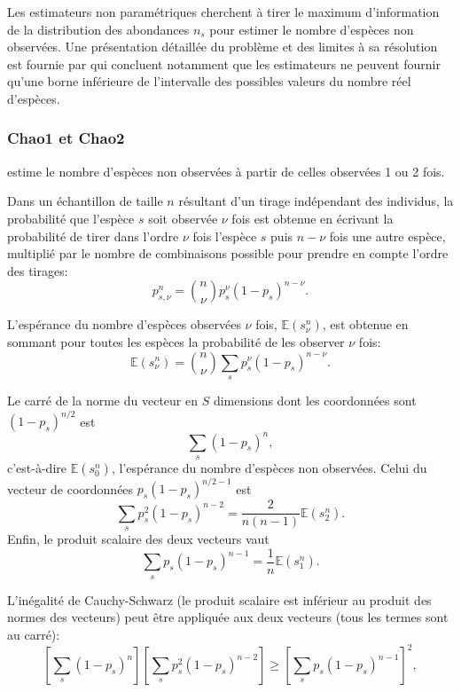 \documentclass[
  11pt,
  french,
  a4paper,
  extrafontsizes,onecolumn,openright
  ]{memoir}
\begin{document}
Les estimateurs non paramétriques cherchent à tirer le maximum d'information de la distribution des abondances \(n_s\) pour estimer le nombre d'espèces non observées.
Une présentation détaillée du problème et des limites à sa résolution est fournie par \textcite{Mao2005} qui concluent notamment que les estimateurs ne peuvent fournir qu'une borne inférieure de l'intervalle des possibles valeurs du nombre réel d'espèces.

\subsubsection{Chao1 et Chao2}\label{chao1-et-chao2}

\textcite{Chao1984} estime le nombre d'espèces non observées à partir de celles observées 1 ou 2 fois.

Dans un échantillon de taille \(n\) résultant d'un tirage indépendant des individus, la probabilité que l'espèce \(s\) soit observée \(\nu\) fois est obtenue en écrivant la probabilité de tirer dans l'ordre \(\nu\) fois l'espèce \(s\) puis \(n-\nu\) fois une autre espèce, multiplié par le nombre de combinaisons possible pour prendre en compte l'ordre des tirages:
\begin{equation}
  \label{eq:psnu}
  p^{n}_{s, \nu} = \binom{n}{\nu} {p_s^\nu \left( 1-p_s \right)^{n-\nu}}.
\end{equation}

L'espérance du nombre d'espèces observées \(\nu\) fois, \({\mathbb E}(s^{n}_{\nu})\), est obtenue en sommant pour toutes les espèces la probabilité de les observer \(\nu\) fois:
\begin{equation}
  \label{eq:Esnnu}
  {\mathbb E}\left( s^{n}_{\nu} \right) = \binom{n}{\nu} \sum_s{p_s^\nu \left( 1-p_s \right)^{n-\nu}}.
\end{equation}

Le carré de la norme du vecteur en \(S\) dimensions dont les coordonnées sont \((1-p_s)^{n/2}\) est
\[\sum_s{(1-p_s)^n},\]
c'est-à-dire \({\mathbb E}(s^{n}_{0})\), l'espérance du nombre d'espèces non observées.
Celui du vecteur de coordonnées \(p_s (1-p_s)^{n/2-1}\) est
\[\sum_s{p_s^2(1-p_s)^{n-2}}=\frac{2}{n(n-1)}{\mathbb E}(s^{n}_{2}).\]
Enfin, le produit scalaire des deux vecteurs vaut
\[\sum_s{p_s(1-p_s)^{n-1}}=\frac{1}{n}{\mathbb E}(s^{n}_{1}).\]

L'inégalité de Cauchy-Schwarz (le produit scalaire est inférieur au produit des normes des vecteurs) peut être appliquée aux deux vecteurs (tous les termes sont au carré):
\begin{equation}
  \label{eq:CauchySchwarz}
  \left[ \sum_s{(1-p_s)^n} \right] \left[ \sum_s{p_s^2(1-p_s)^{n-2}} \right] 
   \ge \left[ \sum_s{p_s(1-p_s)^{n-1}} \right]^2,
\end{equation}
\end{document}
